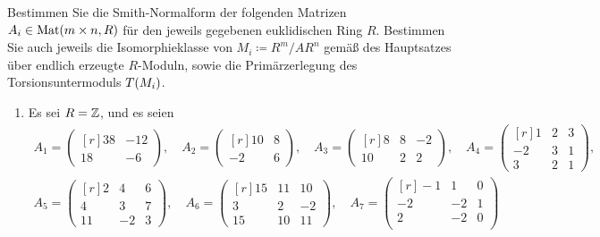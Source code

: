 \begin{question}[subtitle = Smith-Normalform]
    Bestimmen Sie die Smith-Normalform der folgenden Matrizen $A_i \in \operatorname{Mat}(m \times n, R)$ für den jeweils gegebenen euklidischen Ring $R$.
    Bestimmen Sie auch jeweils die Isomorphieklasse von $M_i \coloneqq R^m/AR^n$ gemäß des Hauptsatzes über endlich erzeugte $R$-Moduln, sowie die Primärzerlegung des Torsionsuntermoduls $T(M_i)$.
  \begin{enumerate}
    \item
      Es sei $R = \mathbb{Z}$, und es seien
      \begin{gather*}
        A_1 =
        \begin{pmatrix*}[r]
          38  & -12 \\
          18  &  -6
        \end{pmatrix*},
      \quad
        A_2 =
        \begin{pmatrix*}[r]
          10 & 8 \\
          -2 & 6
        \end{pmatrix*},
      \quad
        A_3 =
        \begin{pmatrix*}[r]
            8 & 8 & -2 \\
          10 & 2 &  2
        \end{pmatrix*},
      \quad
        A_4 =
        \begin{pmatrix*}[r]
           1  & 2 & 3 \\
          -2  & 3 & 1 \\
           3  & 2 & 1
        \end{pmatrix*},
      \\
        A_5 =
        \begin{pmatrix*}[r]
           2  &  4  & 6 \\
           4  &  3  & 7 \\
          11  & -2  & 3
        \end{pmatrix*},
      \quad
        A_6 =
        \begin{pmatrix*}[r]
          15  & 11  & 10 \\
           3  &  2  & -2 \\
          15  & 10  & 11
        \end{pmatrix*},
      \quad
        A_7 = 
        \begin{pmatrix*}[r]
           -1 &  1  & 0 \\
           -2 & -2  & 1 \\
            2 & -2  & 0 \\

\end{pmatrix*}
\end{gather*}
\end{enumerate}
\end{question}
